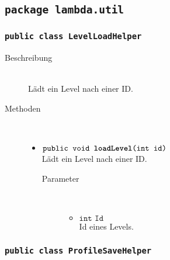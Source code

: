 \subsection{\texttt{package lambda.util}}

\subsubsection{\normalfont \texttt{public class \textbf{LevelLoadHelper}}}

\begin{description}
\item[Beschreibung] \hfill \\ Lädt ein Level nach einer ID.

\item[Methoden] \hfill \\
	\vspace{-.8cm}
	\begin{itemize}
		\item $\texttt{public void \textbf{loadLevel}(int id)}$ \\ Lädt ein Level nach einer ID.
		\begin{description}
			\item[Parameter] \hfill \\
			\vspace{-.8cm}
			\begin{itemize}
				\item $\texttt{int Id}$ \\ Id eines Levels.
			\end{itemize}
		\end{description}
		
			\end{itemize}
\end{description}
		
		\subsubsection{\normalfont \texttt{public class \textbf{ProfileSaveHelper}}}

